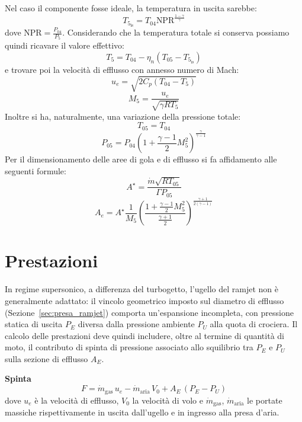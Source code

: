Nel caso il componente fosse ideale, la temperatura in uscita sarebbe:
\begin{equation*}
    T_{5_{\text{is}}} = T_{04} \text{NPR}^{\frac{1-\gamma}{\gamma}}
\end{equation*}
dove \(\text{NPR} = \frac{P_{04}}{P_{5}}\).
Considerando che la temperatura totale si conserva possiamo quindi ricavare il valore effettivo:
\begin{equation*}
    T_{5} = T_{04} - \eta_{n}(T_{05} - T_{5_{\text{is}}})
\end{equation*}
e trovare poi la velocità di efflusso con annesso numero di Mach:
\begin{equation*}
    u_{e} = \sqrt{2C_{p}(T_{04} - T_{5})}
\end{equation*}
\begin{equation*}
    M_{5} =\frac{u_{e}} {\sqrt{\gamma R T_{5}}}
\end{equation*}
Inoltre si ha, naturalmente, una variazione della pressione totale:
\begin{equation*}
    T_{05} =T_{04}
\end{equation*}
\begin{equation*}
    P_{05}=P_{04}(1 + \frac{\gamma-1}{2}M_{5}^2)^\frac{\gamma}{\gamma-1}
\end{equation*}
Per il dimensionamento delle aree di gola e di efflusso si fa affidamento alle seguenti formule:
\[ A^{\star}=\frac{\dot{m}\sqrt{RT_{05}}}{\Gamma P_{05}} \]
\[A_e=A^{\star}\frac{1}{M_5} \left( \frac{1+\frac{\gamma-1}{2}M_5^{2}}{\frac{\gamma+1}{2}} \right)^{\frac{\gamma+1}{2(\gamma-1)}}\]

\section{Prestazioni}
\label{appC:prestazioni}

In regime supersonico, a differenza del turbogetto, l'ugello del ramjet non è generalmente adattato: il vincolo geometrico imposto sul diametro di efflusso (Sezione~\ref{sec:presa_ramjet}) comporta un'espansione incompleta, con pressione statica di uscita $P_E$ diversa dalla pressione ambiente $P_U$ alla quota di crociera. Il calcolo delle prestazioni deve quindi includere, oltre al termine di quantità di moto, il contributo di spinta di pressione associato allo squilibrio tra $P_E$ e $P_U$ sulla sezione di efflusso $A_E$.

\textbf{Spinta} \\
\begin{equation*}
    F = \dot{m}_{\text{gas}}\, u_e - \dot{m}_{\text{aria}}\, V_0 + A_E\,(P_E - P_U)
\end{equation*}
dove $u_e$ è la velocità di efflusso, $V_0$ la velocità di volo e $\dot{m}_{\text{gas}}$, $\dot{m}_{\text{aria}}$ le portate massiche rispettivamente in uscita dall'ugello e in ingresso alla presa d'aria.

